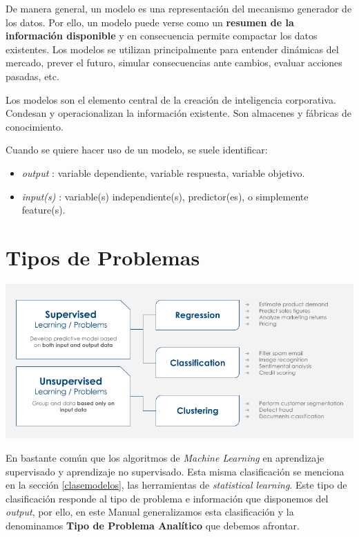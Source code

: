 \documentclass[]{book}
\providecommand{\tightlist}{%
  \setlength{\itemsep}{0pt}\setlength{\parskip}{0pt}}
\begin{document}
De manera general, un modelo es una representación del mecanismo generador de los datos. Por ello, un modelo puede verse como un \textbf{resumen de la información disponible} y en consecuencia permite compactar los datos existentes. Los modelos se utilizan principalmente para entender dinámicas del mercado, prever el futuro, simular consecuencias ante cambios, evaluar acciones pasadas, etc.

Los modelos son el elemento central de la creación de inteligencia corporativa.
Condesan y operacionalizan la información existente. Son almacenes y fábricas de conocimiento.

Cuando se quiere hacer uso de un modelo, se suele identificar:

\begin{itemize}
\tightlist
\item
  \emph{output} : variable dependiente, variable respuesta, variable objetivo.
\item
  \emph{input(s)} : variable(s) independiente(s), predictor(es), o simplemente feature(s).
\end{itemize}

\hypertarget{tipos-de-problemas}{%
\chapter{Tipos de Problemas}\label{tipos-de-problemas}}

\includegraphics[width=0.9\linewidth]{imgs/mlalgorithms01}

En bastante común que los algoritmos de \emph{Machine Learning} en aprendizaje supervisado y aprendizaje no supervisado. Esta misma clasificación se menciona en la sección \ref{clasemodelos}, las herramientas de \emph{statistical learning}. Este tipo de clasificación responde al tipo de problema e información que disponemos del \emph{output}, por ello, en este Manual generalizamos esta clasificación y la denominamos \textbf{Tipo de Problema Analítico} que debemos afrontar.
\end{document}
